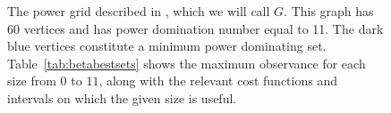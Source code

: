 \documentclass{article}
\begin{document}
\begin{figure}
{
            }
        	\caption{The power grid described in \cite{C2020}, which we will call $G$. This graph has 60 vertices and has power domination number equal to 11. The dark blue vertices constitute a minimum power dominating set. Table~\ref{tab:betabestsets} shows the maximum observance for each size from $0$ to $11$, along with the relevant cost functions and intervals on which the given size is useful.}
        	\label{fig:60nodesystem}
        \end{figure}
        
\end{document}
